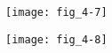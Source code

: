 \begin{figure}[p]
   \centering
   \texttt{[image: fig\_4-7]}
   \caption[{\lipsum*[47][1]}]{\lipsum*[47][1-5]}
   \label{fig:fig_4-7}
\end{figure}

\begin{figure}[p]
   \centering
   \texttt{[image: fig\_4-8]}
   \caption[{\lipsum*[48][1]}]{\lipsum*[48][1-5]}
   \label{fig:fig_4-8}
\end{figure}
